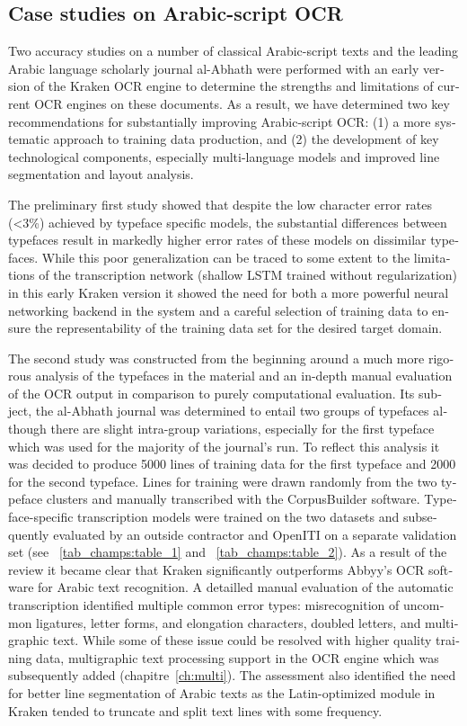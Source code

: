 \begin{french}
\section{Case studies on Arabic-script OCR}

Two accuracy studies on a number of classical Arabic-script texts and the
leading Arabic language scholarly journal al-Abhath were performed with an
early version of the Kraken OCR engine to determine the strengths and
limitations of current OCR engines on these documents. As a result, we have
determined two key recommendations for substantially improving Arabic-script
OCR: (1) a more systematic approach to training data production, and (2) the
development of key technological components, especially multi-language models
and improved line segmentation and layout analysis.

The preliminary first study showed that despite the low character error rates
(<3\%) achieved by typeface specific models, the substantial differences
between typefaces result in markedly higher error rates of these models on
dissimilar typefaces. While this poor generalization can be traced to some
extent to the limitations of the transcription network (shallow LSTM trained
without regularization) in this early Kraken version it showed the need for
both a more powerful neural networking backend in the system and a careful
selection of training data to ensure the representability of the training data
set for the desired target domain.

The second study was constructed from the beginning around a much more rigorous
analysis of the typefaces in the material and an in-depth manual evaluation of
the OCR output in comparison to purely computational evaluation. Its subject,
the al-Abhath journal was determined to entail two groups of typefaces although
there are slight intra-group variations, especially for the first typeface
which was used for the majority of the journal's run. To reflect this analysis
it was decided to produce 5000 lines of training data for the first typeface
and 2000 for the second typeface. Lines for training were drawn randomly from
the two typeface clusters and manually transcribed with the CorpusBuilder
software. Typeface-specific transcription models were trained on the two
datasets and subsequently evaluated by an outside contractor and OpenITI on a
separate validation set (see ~\ref{tab_champs:table_1} and
~\ref{tab_champs:table_2}). As a result of the review it became clear that
Kraken significantly outperforms Abbyy's OCR software for Arabic text
recognition. A detailled manual evaluation of the automatic transcription
identified multiple common error types: misrecognition of uncommon ligatures,
letter forms, and elongation characters, doubled letters, and multigraphic 
text. While some of these issue could be resolved with higher quality training
data, multigraphic text processing support in the OCR engine which was
subsequently added (chapitre~\ref{ch:multi}). The assessment also identified
the need for better line segmentation of Arabic texts as the Latin-optimized
module in Kraken tended to truncate and split text lines with some frequency.


\end{french}
